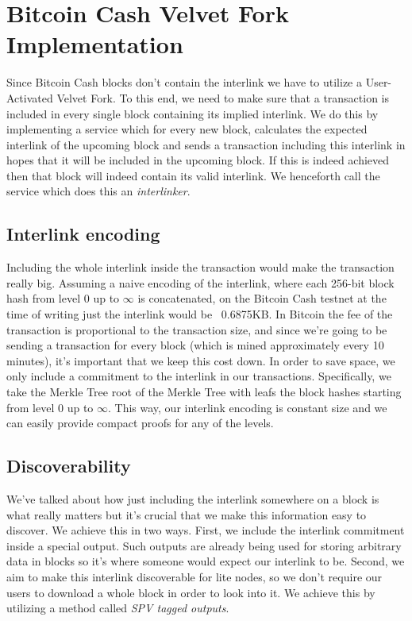 \chapter{Bitcoin Cash Velvet Fork Implementation}
Since Bitcoin Cash blocks don't contain the interlink we have to utilize a User-Activated Velvet Fork. To this end, we need to make sure that a transaction is included in every single block containing its implied interlink. We do this by implementing a service which for every new block, calculates the expected interlink of the upcoming block and sends a transaction including this interlink in hopes that it will be included in the upcoming block. If this is indeed achieved then that block will indeed contain its valid interlink. We henceforth call the service which does this an \emph{interlinker}.

\section{Interlink encoding}
Including the whole interlink inside the transaction would make the transaction really big. Assuming a naive encoding of the interlink, where each 256-bit block hash from level $0$ up to $\infty$ is concatenated, on the Bitcoin Cash testnet at the time of writing just the interlink would be ~0.6875KB. In Bitcoin the fee of the transaction is proportional to the transaction size, and since we're going to be sending a transaction for every block (which is mined approximately every 10 minutes), it's important that we keep this cost down. In order to save space, we only include a commitment to the interlink in our transactions. Specifically, we take the Merkle Tree root of the Merkle Tree with leafs the block hashes starting from level $0$ up to $\infty$. This way, our interlink encoding is constant size and we can easily provide compact proofs for any of the levels.

\section{Discoverability}
We've talked about how just including the interlink somewhere on a block is what really matters but it's crucial that we make this information easy to discover. We achieve this in two ways. First, we include the interlink commitment inside a special  output. Such outputs are already being used for storing arbitrary data in blocks so it's where someone would expect our interlink to be. Second, we aim to make this interlink discoverable for lite nodes, so we don't require our users to download a whole block in order to look into it. We achieve this by utilizing a method called \emph{SPV tagged outputs}. 


